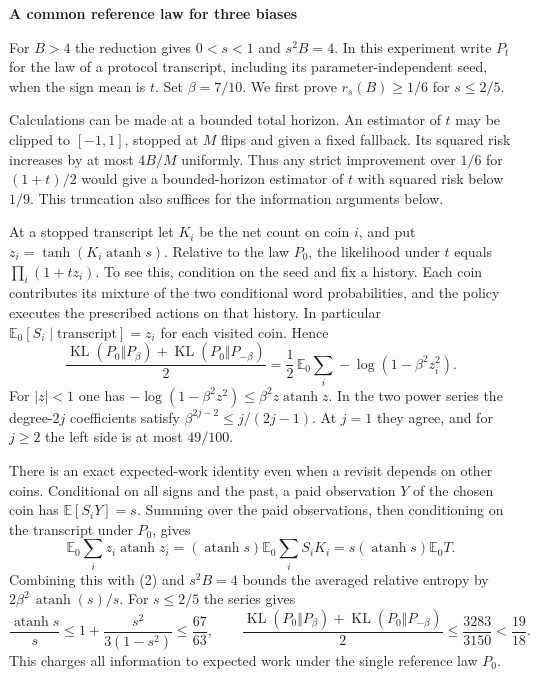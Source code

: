 \documentclass[11pt]{article}
\newcommand{\E}{\mathbb E}
\newcommand{\atanh}{\operatorname{atanh}}
\newcommand{\KL}{\operatorname{KL}}
\newcommand{\heading}[1]{{\LARGE\bfseries\color{ink} #1}\par\smallskip}
\begin{document}
\newpage
\heading{A common reference law for three biases}
For $B>4$ the reduction gives $0<s<1$ and $s^2B=4$. In this experiment write $P_t$ for the law of a protocol transcript, including its parameter-independent seed, when the sign mean is $t$. Set $\beta=7/10$. We first prove $r_s(B)\ge1/6$ for $s\le2/5$.

Calculations can be made at a bounded total horizon. An estimator of $t$ may be clipped to $[-1,1]$, stopped at $M$ flips and given a fixed fallback. Its squared risk increases by at most $4B/M$ uniformly. Thus any strict improvement over $1/6$ for $(1+t)/2$ would give a bounded-horizon estimator of $t$ with squared risk below $1/9$. This truncation also suffices for the information arguments below.

At a stopped transcript let $K_i$ be the net count on coin $i$, and put $z_i=\tanh(K_i\atanh s)$. Relative to the law $P_0$, the likelihood under $t$ equals $\prod_i(1+t z_i)$. To see this, condition on the seed and fix a history. Each coin contributes its mixture of the two conditional word probabilities, and the policy executes the prescribed actions on that history. In particular $\E_0[S_i\mid\text{transcript}]=z_i$ for each visited coin. Hence
\[
 \frac{\KL(P_0\Vert P_\beta)+\KL(P_0\Vert P_{-\beta})}{2}
 =\frac12\,\E_0\sum_i-\log(1-\beta^2 z_i^2).                 \tag{2}
\]
For $|z|<1$ one has $-\log(1-\beta^2 z^2)\le\beta^2 z\atanh z$. In the two power series the degree-$2j$ coefficients satisfy $\beta^{2j-2}\le j/(2j-1)$. At $j=1$ they agree, and for $j\ge2$ the left side is at most $49/100$.

There is an exact expected-work identity even when a revisit depends on other coins. Conditional on all signs and the past, a paid observation $Y$ of the chosen coin has $\E[S_iY]=s$. Summing over the paid observations, then conditioning on the transcript under $P_0$, gives
\[
 \E_0\sum_i z_i\atanh z_i
 =(\atanh s)\E_0\sum_i S_i K_i
 =s(\atanh s)\E_0 T.
\]
Combining this with (2) and $s^2 B=4$ bounds the averaged relative entropy by $2\beta^2\,\atanh(s)/s$. For $s\le 2/5$ the series gives
\[
 \frac{\atanh s}{s}\le1+\frac{s^2}{3(1-s^2)}
 \le\frac{67}{63},\qquad
 \frac{\KL(P_0\Vert P_\beta)+\KL(P_0\Vert P_{-\beta})}{2}
 \le\frac{3283}{3150}<\frac{19}{18}.                         \tag{3}
\]
This charges all information to expected work under the single reference law $P_0$.
\end{document}
